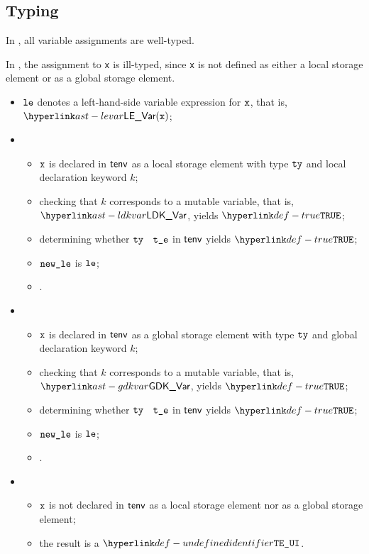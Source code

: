 \subsection{Typing}
In , all variable assignments are well-typed.

In , the assignment to \verb|x| is ill-typed,
since \verb|x| is not defined as either a local storage element or as a global storage element.

\ProseParagraph
\OneApplies
\begin{itemize}
  \item $\texttt{le}$ denotes a left-hand-side variable expression for $\texttt{x}$, that is, $\LEVar(\vx)$;
  \item {}
  \begin{itemize}
    \item $\texttt{x}$ is declared in $\textsf{tenv}$ as a local storage element with type $\texttt{ty}$ and local declaration keyword $k$;
    \item checking that $k$ corresponds to a mutable variable, that is, $\LDKVar$, yields $\True$\ProseTerminateAs{\AssignmentToImmutable};
    \item determining whether $\texttt{ty}$ \typesatisfies\ $\texttt{t\_e}$ in $\textsf{tenv}$ yields $\True$\ProseOrTypeError;
    \item $\texttt{new\_le}$ is $\texttt{le}$;
    \item {}.
  \end{itemize}

  \item {}
  \begin{itemize}
    \item $\texttt{x}$ is declared in $\textsf{tenv}$ as a global storage element with type $\texttt{ty}$ and global declaration keyword $k$;
    \item checking that $k$ corresponds to a mutable variable, that is, $\GDKVar$, yields $\True$\ProseTerminateAs{\AssignmentToImmutable};
    \item determining whether $\texttt{ty}$ \typesatisfies\ $\texttt{t\_e}$ in $\textsf{tenv}$ yields $\True$\ProseOrTypeError;
    \item $\texttt{new\_le}$ is $\texttt{le}$;
    \item {}.
  \end{itemize}

  \item {}
  \begin{itemize}
    \item $\texttt{x}$ is not declared in $\textsf{tenv}$ as a local storage element nor as a global storage element;
    \item the result is a \typingerrorterm{} $\UndefinedIdentifier$.
  \end{itemize}
\end{itemize}

